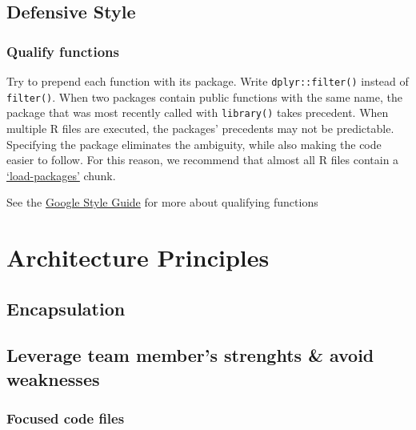 \documentclass[
]{book}
\begin{document}
\hypertarget{defensive-style}{%
\section{Defensive Style}\label{defensive-style}}

\hypertarget{qualify-functions}{%
\subsection{Qualify functions}\label{qualify-functions}}

Try to prepend each function with its package. Write \texttt{dplyr::filter()} instead of \texttt{filter()}. When two packages contain public functions with the same name, the package that was most recently called with \texttt{library()} takes precedent. When multiple R files are executed, the packages' precedents may not be predictable. Specifying the package eliminates the ambiguity, while also making the code easier to follow. For this reason, we recommend that almost all R files contain a \protect\hyperlink{chunk-load-packages}{`load-packages'} chunk.

See the \href{https://google.github.io/styleguide/Rguide.html\#qualifying-namespaces}{Google Style Guide} for more about qualifying functions

\hypertarget{architecture}{%
\chapter{Architecture Principles}\label{architecture}}

\hypertarget{encapsulation}{%
\section{Encapsulation}\label{encapsulation}}

\hypertarget{leverage-team-members-strenghts-avoid-weaknesses}{%
\section{Leverage team member's strenghts \& avoid weaknesses}\label{leverage-team-members-strenghts-avoid-weaknesses}}

\hypertarget{focused-code-files}{%
\subsection{Focused code files}\label{focused-code-files}}
\end{document}
